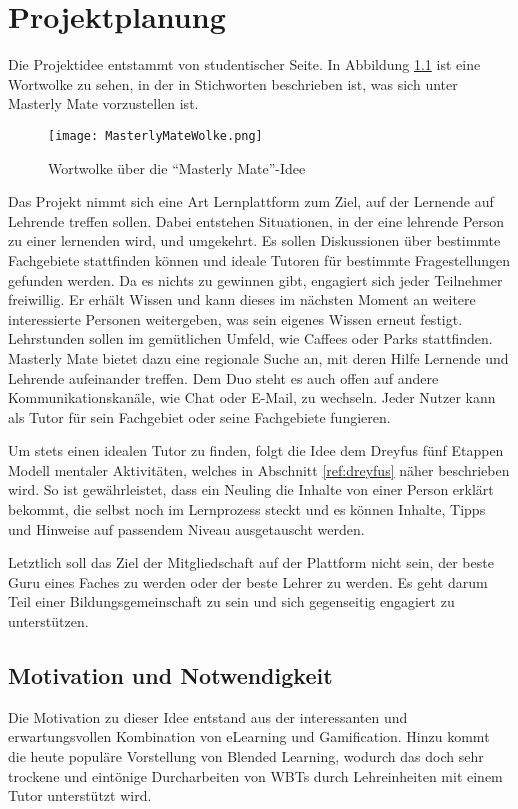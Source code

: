 \chapter{Projektplanung}
Die Projektidee entstammt von studentischer Seite. In Abbildung
\ref{ref:wolkeMM} ist eine Wortwolke zu sehen, in der in Stichworten beschrieben
ist, was sich unter Masterly Mate vorzustellen ist.

\begin{figure}[H]
\texttt{[image: MasterlyMateWolke.png]}
\caption{Wortwolke über die "`Masterly Mate"'-Idee}\label{ref:wolkeMM}
\end{figure}

Das Projekt nimmt sich eine Art Lernplattform zum Ziel, auf der Lernende auf
Lehrende treffen sollen. Dabei entstehen Situationen, in der eine lehrende
Person zu einer lernenden wird, und umgekehrt. Es sollen Diskussionen über
bestimmte Fachgebiete stattfinden können und ideale Tutoren für bestimmte
Fragestellungen gefunden werden. Da es nichts zu gewinnen gibt, engagiert sich
jeder Teilnehmer freiwillig. Er erhält Wissen und kann dieses im nächsten Moment
an weitere interessierte Personen weitergeben, was sein eigenes Wissen erneut
festigt. Lehrstunden sollen im gemütlichen Umfeld, wie Caffees oder Parks
stattfinden. Masterly Mate bietet dazu eine regionale Suche an, mit deren Hilfe
Lernende und Lehrende aufeinander treffen. Dem Duo steht es auch offen auf
andere Kommunikationskanäle, wie Chat oder E-Mail, zu wechseln. Jeder Nutzer
kann als Tutor für sein Fachgebiet oder seine Fachgebiete fungieren.

Um stets einen idealen Tutor zu finden, folgt die Idee dem Dreyfus fünf Etappen
Modell mentaler Aktivitäten, welches in Abschnitt \ref{ref:dreyfus} näher
beschrieben wird. So ist gewährleistet, dass ein Neuling die Inhalte von einer
Person erklärt bekommt, die selbst noch im Lernprozess steckt und es können
Inhalte, Tipps und Hinweise auf passendem Niveau ausgetauscht werden.

Letztlich soll das Ziel der Mitgliedschaft auf der Plattform nicht sein, der
beste Guru eines Faches zu werden oder der beste Lehrer zu werden. Es geht darum
Teil einer Bildungsgemeinschaft zu sein und sich gegenseitig engagiert zu
unterstützen.

\section{Motivation und Notwendigkeit}\label{ref:projectMotivation}
Die Motivation zu dieser Idee entstand aus der interessanten und
erwartungsvollen Kombination von eLearning und Gamification. Hinzu kommt die
heute populäre Vorstellung von Blended Learning, wodurch das doch sehr trockene
und eintönige Durcharbeiten von WBTs durch Lehreinheiten mit einem Tutor
unterstützt wird.


